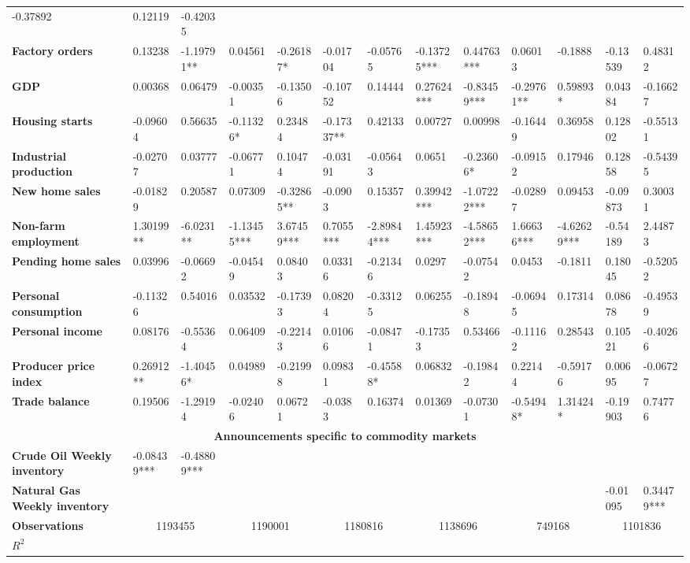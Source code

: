 \begin{sidewaystable}
{\begin{tabular}{@{}lllllllllllll@{}}
-0.37892 & 0.12119 & -0.42035 \\ \textbf{Factory orders}& 0.13238 & -1.19791** & 0.04561 & -0.26187* & -0.01704 & -0.05765 & -0.13725*** & 0.44763*** & 0.06013 & -0.1888 & -0.13539 & 0.48312 \\ \textbf{GDP}& 0.00368 & 0.06479 & -0.00351 & -0.13506 & -0.10752 & 0.14444 & 0.27624*** & -0.83459*** & -0.29761** & 0.59893* & 0.04384 & -0.16627 \\ \textbf{Housing starts}& -0.09604 & 0.56635 & -0.11326* & 0.23484 & -0.17337** & 0.42133 & 0.00727 & 0.00998 & -0.16449 & 0.36958 & 0.12802 & -0.55131 \\ \textbf{Industrial production}& -0.02707 & 0.03777 & -0.06771 & 0.10474 & -0.03191 & -0.05643 & 0.0651 & -0.23606* & -0.09152 & 0.17946 & 0.12858 & -0.54395 \\ \textbf{New home sales}& -0.01829 & 0.20587 & 0.07309 & -0.32865** & -0.0903 & 0.15357 & 0.39942*** & -1.07222*** & -0.02897 & 0.09453 & -0.09873 & 0.30031 \\ \textbf{Non-farm employment}& 1.30199** & -6.0231** & -1.13455***& 3.67459***& 0.7055*** & -2.89844*** & 1.45923*** & -4.58652*** & 1.66636*** & -4.62629*** & -0.54189 & 2.44873 \\ \textbf{Pending home sales}& 0.03996 & -0.06692 & -0.04549 & 0.08403 & 0.03316 & -0.21346 & 0.0297 & -0.07542 & 0.0453 & -0.1811 & 0.18045 & -0.52052 \\ \textbf{Personal consumption}& -0.11326 & 0.54016 & 0.03532 & -0.17393 & 0.08204 & -0.33125 & 0.06255 & -0.18948 & -0.06945 & 0.17314 & 0.08678 & -0.49539 \\ \textbf{Personal income}& 0.08176 & -0.55364 & 0.06409 & -0.22143 & 0.01066 & -0.08471 & -0.17353 & 0.53466 & -0.11162 & 0.28543 & 0.10521 & -0.40266 \\ \textbf{Producer price index}& 0.26912** & -1.40456* & 0.04989 & -0.21998 & 0.09831 & -0.45588* & 0.06832 & -0.19842 & 0.22144 & -0.59176 & 0.00695 & -0.06727 \\ \textbf{Trade balance}& 0.19506 & -1.29194 & -0.02406 & 0.06721 & -0.0383 & 0.16374 & 0.01369 & -0.07301 & -0.54948* & 1.31424* & -0.19903 & 0.74776 \\  \midrule \multicolumn{13}{c}{\textbf{Announcements specific to commodity markets}} \\ \midrule \textbf{Crude Oil Weekly inventory}& -0.08439*** & -0.48809*** &  &  &  &  &  &  &  &  &  &  \\ \textbf{Natural Gas Weekly inventory}&  &  &  &  &  &  &  &  &  &  & -0.01095 & 0.34479*** \\  \midrule \textbf{Observations}             &\multicolumn{2}{c}{ 1193455 }                                                 & \multicolumn{2}{c}{ 1190001 }                                                 & \multicolumn{2}{c}{ 1180816 }                                                 & \multicolumn{2}{c}{ 1138696 }                                                 & \multicolumn{2}{c}{ 749168 }                                                   & \multicolumn{2}{c}{ 1101836 }                                                 \\ \textbf{$R^2$}             
\end{tabular}}
\end{sidewaystable}
